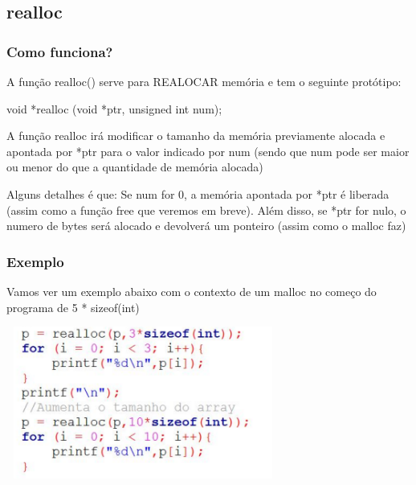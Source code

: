 \documentclass{report}
\begin{document}
	

	
	\subsection{realloc}
	\subsubsection{Como funciona?}
	A função realloc() serve para REALOCAR memória e tem o seguinte protótipo:
	
	\begin{center}
		\begin{LARGE}
			void *realloc (void *ptr, unsigned int num);
		\end{LARGE}
	\end{center}
	
	A função realloc irá modificar o tamanho da memória previamente alocada e apontada por *ptr para o valor indicado por num (sendo que num pode ser maior ou menor do que a quantidade de memória alocada)
	
	Alguns detalhes é que: Se num for 0, a memória apontada por *ptr é liberada (assim como a função free que veremos em breve). Além disso, se *ptr for nulo, o numero de bytes será alocado e devolverá um ponteiro (assim como o malloc faz)
	
	\subsubsection{Exemplo}
	
	Vamos ver um exemplo abaixo com o contexto de um malloc no começo do programa de 5 * sizeof(int)
	
	\begin{center}
		
		\includegraphics[width=9cm,height=5cm,keepaspectratio=false]{imagens/realloc.png}
		
	\end{center}
	
\end{document}
